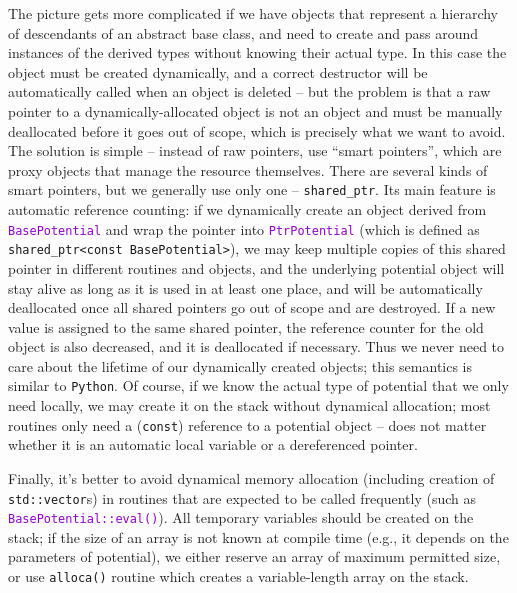\documentclass[12pt]{article}
\newcommand{\Python}{\texttt{Python}\xspace}
\newcommand{\ttt}[1]{\textcolor{darkviolet}{\texttt{#1}}}
\begin{document}
\label{sec:SmartPointers}
The picture gets more complicated if we have objects that represent a hierarchy of descendants of an abstract base class, and need to create and pass around instances of the derived types without knowing their actual type. In this case the object must be created dynamically, and a correct destructor will be automatically called when an object is deleted -- but the problem is that a raw pointer to a dynamically-allocated object is not an object and must be manually deallocated before it goes out of scope, which is precisely what we want to avoid. The solution is simple -- instead of raw pointers, use ``smart pointers'', which are proxy objects that manage the resource themselves. There are several kinds of smart pointers, but we generally use only one -- \texttt{shared_ptr}. Its main feature is automatic reference counting: if we dynamically create an object derived from \ttt{BasePotential} and wrap the pointer into \ttt{PtrPotential} (which is defined as \texttt{shared_ptr<const BasePotential>}), we may keep multiple copies of this shared pointer in different routines and objects, and the underlying potential object will stay alive as long as it is used in at least one place, and will be automatically deallocated once all shared pointers go out of scope and are destroyed. If a new value is assigned to the same shared pointer, the reference counter for the old object is also decreased, and it is deallocated if necessary. Thus we never need to care about the lifetime of our dynamically created objects; this semantics is similar to \Python.
Of course, if we know the actual type of potential that we only need locally, we may create it on the stack without dynamical allocation; most routines only need a (\texttt{const}) reference to a potential object -- does not matter whether it is an automatic local variable or a dereferenced pointer.

Finally, it's better to avoid dynamical memory allocation (including creation of \texttt{std::vector}s) in routines that are expected to be called frequently (such as \ttt{BasePotential::eval()}). All temporary variables should be created on the stack; if the size of an array is not known at compile time (e.g., it depends on the parameters of potential), we either reserve an array of maximum permitted size, or use \texttt{alloca()} routine which creates a variable-length array on the stack.
\end{document}
